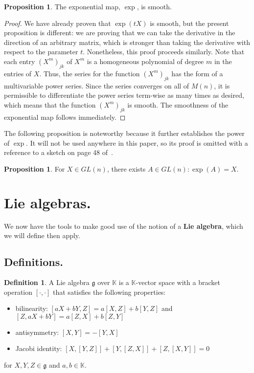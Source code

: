 \documentclass[12pt]{article}
\newcommand{\K}{\mathbb{K}}
\newcommand{\g}{\mathfrak{g}}
\theoremstyle{definition}
\newtheorem{prop}[them]{Proposition}
\theoremstyle{definition}
\theoremstyle{definition}
\theoremstyle{definition}
\theoremstyle{definition}
\newtheorem{defn}[them]{Definition}
\theoremstyle{definition}
\theoremstyle{definition}
\theoremstyle{definition}
\begin{document}
\begin{prop} 
The exponential map, $\exp$, is smooth.
\end{prop}
\begin{proof} We have already
proven that $\exp(tX)$ is smooth, but the present proposition
is different: we are proving that we can take the
derivative in the direction of an arbitrary
matrix, which is stronger than taking the
derivative with respect to the parameter $t$.
Nonetheless, this proof proceeds similarly. Note
that each entry ${(X^m)}_{jk}$ of $X^m$ is a homogeneous
polynomial of degree $m$ in the entries of $X$.
Thus, the series for the function ${(X^m)}_{jk}$ has
the form of a multivariable power series. Since
the series converges on all of $M(n)$, it is
permissible to differentiate the power series
term-wise as many times as desired, which means
that the function ${(X^m)}_{jk}$ is smooth. The
smoothness of the exponential map follows
immediately.
\end{proof}

\par{The following proposition is noteworthy
because it further establishes the power of
$\exp$. It will not be used anywhere in this
paper, so its proof is omitted with a reference to
a sketch on page 48 of~\cite{Hall}.}

\begin{prop} 
For $X \in GL(n)$, there exists $A \in GL(n):
\exp(A) = X$.
\end{prop}

\section{Lie algebras.}
\par{We now have the tools to make good use of the
notion of a \textbf{Lie algebra}, which we will
define then apply.}

\subsection{Definitions.}
\begin{defn}\label{def:la}
A Lie algebra $\g$ over $\K$ is a $\K$-vector
space with a bracket operation $[\cdot,\cdot]$
that satisfies the following properties:

\begin{itemize}
    \item bilinearity: $[aX + bY, Z] = a[X, Z] +
    b[Y, Z]$ and $[Z, aX + bY] = a[Z, X] +
    b[Z, Y]$
    \item antisymmetry: $[X,Y] = -[Y,X]$
    \item Jacobi identity: $[X, [Y, Z]] + [Y, [Z,
    X]] + [Z, [X, Y]] = 0$
\end{itemize}

for $X, Y, Z \in \g$ and $a, b \in \K$.
\end{defn}
\end{document}
